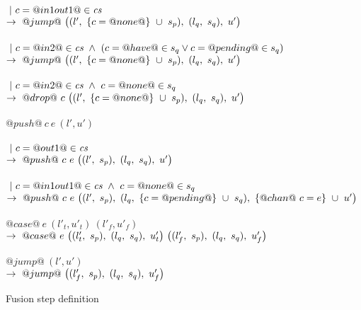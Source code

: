 \begin{figure}
\begin{tabbing}
\> \> \\
\> \> $~|~c=@in1out1@\in\textit{cs}$ \\
\> \> $\to~@jump@~
      \big((l',~\{ c=@none@ \}~\cup~s_p),~(l_q,~s_q),~u' \big)
      $ \\

\> \> \\
\> \> $~|~c=@in2@\in\textit{cs} ~\wedge~ (c=@have@ \in s_q \vee c=@pending@ \in s_q)$ \\
\> \> $\to~@jump@~
      \big((l',~\{ c=@none@ \}~\cup~s_p),~(l_q,~s_q),~u' \big)
      $ \\


\> \> \\
\> \> $~|~c=@in2@\in\textit{cs} ~\wedge~ c=@none@ \in s_q$ \\
\> \> $\to~@drop@~c~
      \big((l',~\{ c=@none@ \}~\cup~s_p),~(l_q,~s_q),~u' \big)
      $ \\
\\

\> $@push@~c~e~(l',u')$ \\
\> \> \\
\> \> $~|~c=@out1@\in\textit{cs}$ \\
\> \> $\to~@push@~c~e~
      \big((l',~s_p),~(l_q,~s_q),~u' \big)
      $ \\

\> \> \\
\> \> $~|~c=@in1out1@\in\textit{cs} ~\wedge~ c=@none@ \in s_q$ \\
\> \> $\to~@push@~c~e~
      \big((l',~s_p),~(l_q,~\{ c=@pending@ \}~\cup~s_q),~\{ @chan@~c=e \}~\cup~u' \big)
      $ \\

\\

\> $@case@~e~(l'_t,u'_t)~(l'_f,u'_f)$ \\
\> \> $\to~@case@~e~
      \big((l'_t,~s_p),~(l_q,~s_q),~u'_t \big)
      ~
      \big((l'_f,~s_p),~(l_q,~s_q),~u'_f \big)
      $ \\

\\

\> $@jump@~(l',u')$ \\
\> \> $\to~@jump@~
      \big((l'_f,~s_p),~(l_q,~s_q),~u'_f \big)
      $ \\
\end{tabbing}

\caption{Fusion step definition}
\label{fig:Fusion:Def:Step}
\end{figure}

